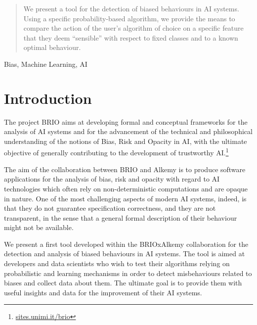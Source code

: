 \documentclass[
]{ceurart}
\begin{document}

\begin{abstract}
We present a tool for the detection of biased behaviours in AI systems. Using a specific probability-based algorithm,
we provide the means to compare the action of the user's algorithm of choice on a specific feature that they deem ``sensible'' with respect to fixed classes and to a known optimal behaviour.
\end{abstract}

\begin{keywords}
Bias, Machine Learning, AI
\end{keywords}

\maketitle

\section{Introduction}
\label{sec:intro}


The project BRIO aims at developing formal and conceptual frameworks for the analysis of AI systems and for the advancement of the technical and philosophical understanding of the notions of Bias, Risk and Opacity in AI, with the ultimate objective of generally contributing to the development of trustworthy AI.\footnote{\url{sites.unimi.it/brio}} 

The aim of the collaboration between BRIO and Alkemy is to produce software applications for the analysis of bias, risk and opacity with regard to AI technologies which often rely on non-deterministic computations and are opaque in nature. One of the most challenging aspects of modern AI systems, indeed, is that they do not guarantee specification correctness, and they are not transparent, in the sense that a general formal description of their behaviour might not be available.

We present a first tool developed within the BRIOxAlkemy collaboration for the detection and analysis of biased behaviours in AI systems. The tool is aimed at developers and data scientists who wish to test their algorithms relying on probabilistic and learning mechanisms in order to detect misbehaviours related to biases and collect data about them. The ultimate goal is to provide them with useful insights and data for the improvement of their AI systems.
\end{document}
